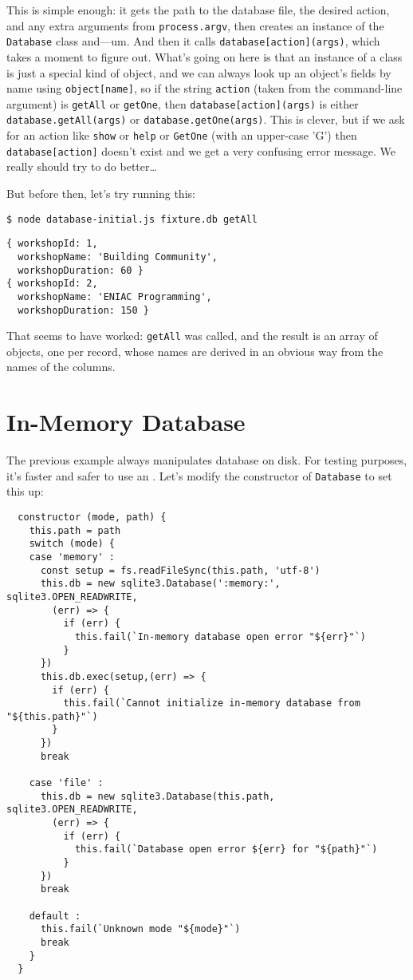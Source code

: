 This is simple enough:
it gets the path to the database file,
the desired action,
and any extra arguments from \texttt{process.argv},
then creates an instance of the \texttt{Database} class and---um.
And then it calls \texttt{database[action](args)},
which takes a moment to figure out.
What's going on here is that an instance of a class is just a special kind of object,
and we can always look up an object's fields by name using \texttt{object[name]},
so if the string \texttt{action} (taken from the command-line argument) is \texttt{getAll} or \texttt{getOne},
then \texttt{database[action](args)} is either \texttt{database.getAll(args)} or \texttt{database.getOne(args)}.
This  is  clever, but if we ask for an action like \texttt{show} or \texttt{help} or \texttt{GetOne}
(with an upper-case 'G')
then \texttt{database[action]} doesn't exist and we get a very confusing error message.
We really should try to do better{\ldots}

But before then,
let's try running this:

\begin{verbatim}
$ node database-initial.js fixture.db getAll
\end{verbatim}

\begin{verbatim}
{ workshopId: 1,
  workshopName: 'Building Community',
  workshopDuration: 60 }
{ workshopId: 2,
  workshopName: 'ENIAC Programming',
  workshopDuration: 150 }
\end{verbatim}

\noindent
That seems to have worked:
\texttt{getAll} was called,
and the result is an array of objects,
one per record,
whose names are derived in an obvious way from the names of the columns.

\section{In-Memory Database}\label{s:db-in-memory}

The previous example always manipulates database on disk.
For testing purposes,
it's faster and safer to use an .
Let's modify the constructor of \texttt{Database} to set this up:

\begin{verbatim}
  constructor (mode, path) {
    this.path = path
    switch (mode) {
    case 'memory' :
      const setup = fs.readFileSync(this.path, 'utf-8')
      this.db = new sqlite3.Database(':memory:', sqlite3.OPEN_READWRITE,
        (err) => {
          if (err) {
            this.fail(`In-memory database open error "${err}"`)
          }
      })
      this.db.exec(setup,(err) => {
        if (err) {
          this.fail(`Cannot initialize in-memory database from "${this.path}"`)
        }
      })
      break

    case 'file' :
      this.db = new sqlite3.Database(this.path, sqlite3.OPEN_READWRITE,
        (err) => {
          if (err) {
            this.fail(`Database open error ${err} for "${path}"`)
          }
      })
      break

    default :
      this.fail(`Unknown mode "${mode}"`)
      break
    }
  }
\end{verbatim}

